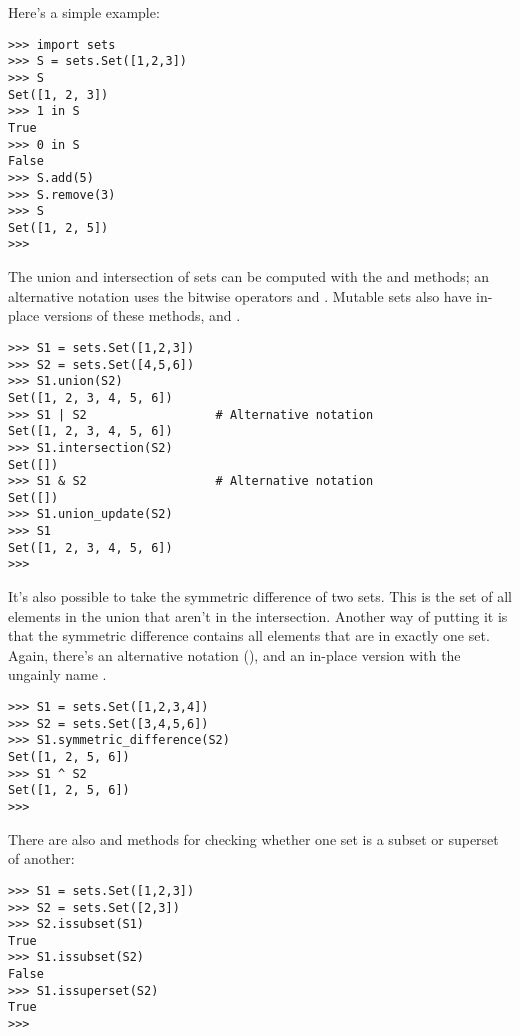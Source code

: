 \documentclass{howto}
\begin{document}
Here's a simple example:

\begin{verbatim}
>>> import sets
>>> S = sets.Set([1,2,3])
>>> S
Set([1, 2, 3])
>>> 1 in S
True
>>> 0 in S
False
>>> S.add(5)
>>> S.remove(3)
>>> S
Set([1, 2, 5])
>>>
\end{verbatim}

The union and intersection of sets can be computed with the
 and  methods; an alternative
notation uses the bitwise operators \code{\&} and \code{|}.
Mutable sets also have in-place versions of these methods,
 and .

\begin{verbatim}
>>> S1 = sets.Set([1,2,3])
>>> S2 = sets.Set([4,5,6])
>>> S1.union(S2)
Set([1, 2, 3, 4, 5, 6])
>>> S1 | S2                  # Alternative notation
Set([1, 2, 3, 4, 5, 6])
>>> S1.intersection(S2)
Set([])
>>> S1 & S2                  # Alternative notation
Set([])
>>> S1.union_update(S2)
>>> S1
Set([1, 2, 3, 4, 5, 6])
>>>
\end{verbatim}

It's also possible to take the symmetric difference of two sets.  This
is the set of all elements in the union that aren't in the
intersection.  Another way of putting it is that the symmetric
difference contains all elements that are in exactly one
set.  Again, there's an alternative notation (\code{\^}), and an
in-place version with the ungainly name
.

\begin{verbatim}
>>> S1 = sets.Set([1,2,3,4])
>>> S2 = sets.Set([3,4,5,6])
>>> S1.symmetric_difference(S2)
Set([1, 2, 5, 6])
>>> S1 ^ S2
Set([1, 2, 5, 6])
>>>
\end{verbatim}

There are also  and  methods
for checking whether one set is a subset or superset of another:

\begin{verbatim}
>>> S1 = sets.Set([1,2,3])
>>> S2 = sets.Set([2,3])
>>> S2.issubset(S1)
True
>>> S1.issubset(S2)
False
>>> S1.issuperset(S2)
True
>>>
\end{verbatim}


\begin{seealso}


\end{seealso}
\end{document}
